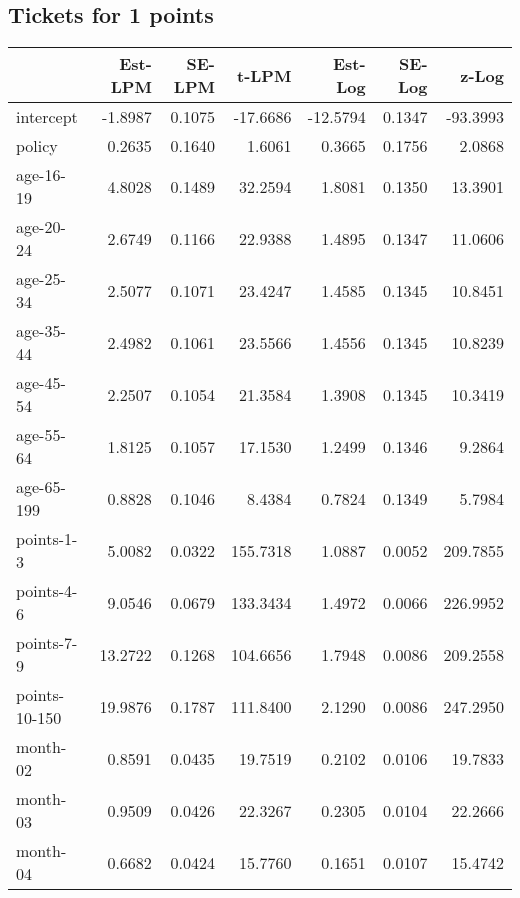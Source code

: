 \documentclass[10pt]{article}
\begin{document}

\subsection{Tickets for 1 points}




\begin{table}[ht]
\centering
\begin{tabular}{lrrrrrr}
  \hline
 & Est-LPM & SE-LPM & t-LPM & Est-Log & SE-Log & z-Log \\ 
  \hline
intercept & -1.8987 & 0.1075 & -17.6686 & -12.5794 & 0.1347 & -93.3993 \\ 
  policy & 0.2635 & 0.1640 & 1.6061 & 0.3665 & 0.1756 & 2.0868 \\ 
  age-16-19 & 4.8028 & 0.1489 & 32.2594 & 1.8081 & 0.1350 & 13.3901 \\ 
  age-20-24 & 2.6749 & 0.1166 & 22.9388 & 1.4895 & 0.1347 & 11.0606 \\ 
  age-25-34 & 2.5077 & 0.1071 & 23.4247 & 1.4585 & 0.1345 & 10.8451 \\ 
  age-35-44 & 2.4982 & 0.1061 & 23.5566 & 1.4556 & 0.1345 & 10.8239 \\ 
  age-45-54 & 2.2507 & 0.1054 & 21.3584 & 1.3908 & 0.1345 & 10.3419 \\ 
  age-55-64 & 1.8125 & 0.1057 & 17.1530 & 1.2499 & 0.1346 & 9.2864 \\ 
  age-65-199 & 0.8828 & 0.1046 & 8.4384 & 0.7824 & 0.1349 & 5.7984 \\ 
  points-1-3 & 5.0082 & 0.0322 & 155.7318 & 1.0887 & 0.0052 & 209.7855 \\ 
  points-4-6 & 9.0546 & 0.0679 & 133.3434 & 1.4972 & 0.0066 & 226.9952 \\ 
  points-7-9 & 13.2722 & 0.1268 & 104.6656 & 1.7948 & 0.0086 & 209.2558 \\ 
  points-10-150 & 19.9876 & 0.1787 & 111.8400 & 2.1290 & 0.0086 & 247.2950 \\ 
  month-02 & 0.8591 & 0.0435 & 19.7519 & 0.2102 & 0.0106 & 19.7833 \\ 
  month-03 & 0.9509 & 0.0426 & 22.3267 & 0.2305 & 0.0104 & 22.2666 \\ 
  month-04 & 0.6682 & 0.0424 & 15.7760 & 0.1651 & 0.0107 & 15.4742 \\ 

\end{tabular}
\end{table}
\end{document}
